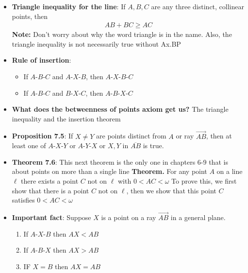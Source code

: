 \documentclass{report}
\begin{document}
\begin{itemize}
    \item \textbf{Triangle inequality for the line}: If $A,B,C$ are any three distinct, collinear points, then 
        \begin{align*}
            AB + BC \geq AC 
        \end{align*}
        \bigbreak \noindent 
        \textbf{Note:} Don't worry about why the word triangle is in the name. Also, the triangle inequality is not necessarily true without Ax.BP
        \bigbreak \noindent 

    \item \textbf{Rule of insertion}: 
        \begin{itemize}
            \item If $ A\text{-}B\text{-}C$ and $ A\text{-}X\text{-}B$, then $ A\text{-}X\text{-}B\text{-}C $
            \item If $ A\text{-}B\text{-}C$ and $ B\text{-}X\text{-}C$, then $ A\text{-}B\text{-}X\text{-}C $
        \end{itemize}

    \item \textbf{What does the betweenness of points axiom get us?} The triangle inequality and the insertion theorem 

    \item \textbf{Proposition 7.5}: If $X \ne Y$ are points distinct from $A$ or ray $\overrightarrow{AB}$, then at least one of $ A\text{-}X\text{-}Y$ or $ A\text{-}Y\text{-}X$ or $X,Y$ in $ \overline{AB}$ is true.
    \item \textbf{Theorem 7.6}: This next theorem is the only one in chapters 6-9 that is about points on more than a single line
        \bigbreak \noindent 
        \textbf{Theorem.} For any point $A$ on a line $\ell$ there exists a point $C$ not on $\ell$ with $0 < AC <\omega$ 
        \bigbreak \noindent 
        To prove this, we first show that there is a point $C$ not on $\ell$, then we show that this point $C$ satisfies $0 < AC < \omega$

    \item \textbf{Important fact}:  Suppose $X$ is a point on a ray $\overrightarrow{AB}$ in a general plane.
        \begin{enumerate}
            \item If $ A\text{-}X\text{-}B$ then $AX < AB $
            \item If $ A\text{-}B\text{-}X$ then $AX > AB $
            \item IF $X = B$ then $AX = AB$
        \end{enumerate}









    \end{itemize}
\end{document}
